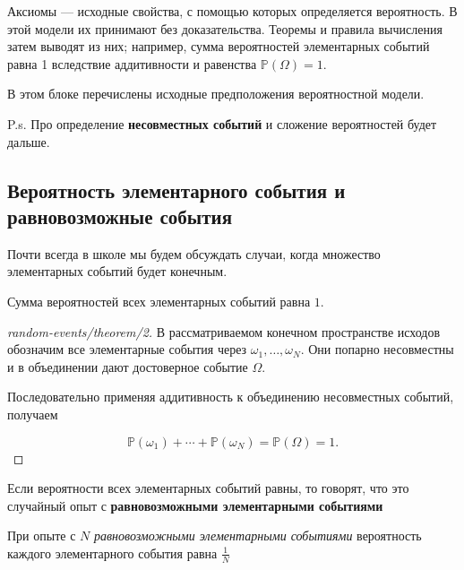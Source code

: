 \begin{explanation}\label{solution-random-events-theorem-1}
Аксиомы — исходные свойства, с помощью которых определяется вероятность. В этой модели их принимают без доказательства. Теоремы и правила вычисления затем выводят из них; например, сумма вероятностей элементарных событий равна 1 вследствие аддитивности и равенства $\mathbb P(\Omega)=1$.

В этом блоке перечислены исходные предположения вероятностной модели.
\end{explanation}

P.s. Про определение \textbf{несовместных событий} и сложение вероятностей будет дальше.

\subsection{Вероятность элементарного события и равновозможные события}

Почти всегда в школе мы будем обсуждать случаи, когда множество элементарных событий будет конечным.\\

\begin{theorem}\label{theorem-2}
Сумма вероятностей всех элементарных событий равна $1$.
\end{theorem}

\begin{proof}[random-events/theorem/2]\label{solution-random-events-theorem-2}
В рассматриваемом конечном пространстве исходов обозначим все элементарные события через $\omega_1,\ldots,\omega_N$. Они попарно несовместны и в объединении дают достоверное событие $\Omega$.

Последовательно применяя аддитивность к объединению несовместных событий, получаем

\[\mathbb P(\omega_1)+\cdots+\mathbb P(\omega_N)=\mathbb P(\Omega)=1.\]
\end{proof}

\begin{definition}
Если вероятности всех элементарных событий равны, то говорят, что это случайный опыт с \textbf{равновозможными элементарными событиями}
\end{definition}

\begin{theorem}\label{theorem-3}
При опыте с $N$ \emph{равновозможными элементарными событиями} вероятность каждого элементарного события равна $\frac{1}{N}$
\end{theorem}

